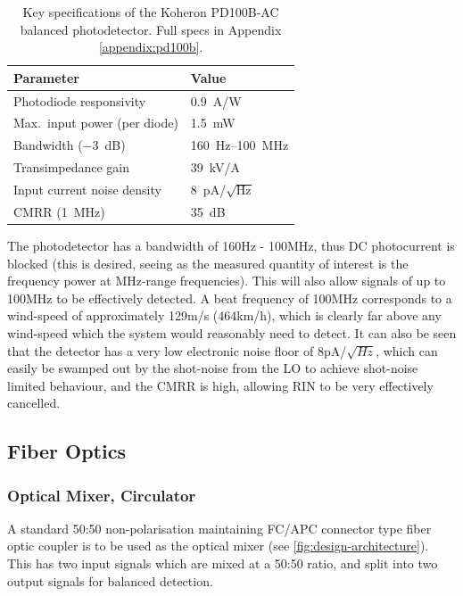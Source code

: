  \begin{table}[H]
 	\centering
 	
 	\begin{tabular}{@{}ll@{}}
 		\toprule
 		\textbf{Parameter} & \textbf{Value} \\
 		\midrule
 		Photodiode responsivity       & 0.9~A/W \\
 		Max.\ input power (per diode) & 1.5~mW \\
 		Bandwidth ($-3$~dB)           & 160~Hz--100~MHz \\
 		Transimpedance gain           & 39~kV/A \\
 		Input current noise density   & 8~pA/$\sqrt{\text{Hz}}$ \\
 		CMRR (1~MHz)                  & 35~dB \\
 		\bottomrule
 	\end{tabular}
 	
 	\caption{Key specifications of the Koheron PD100B-AC balanced photodetector. Full specs in Appendix \ref{appendix:pd100b}.}
 	\label{tab:pd100b}
 \end{table}
 
 The photodetector has a bandwidth of 160Hz - 100MHz, thus DC photocurrent is blocked (this is desired, seeing as the measured quantity of interest is the frequency power at MHz-range frequencies). This will also allow signals of up to 100MHz to be effectively detected. A beat frequency of 100MHz corresponds to a wind-speed of approximately 129m/s (464km/h), which is clearly far above any wind-speed which the system would reasonably need to detect. It can also be seen that the detector has a very low electronic noise floor of 8pA/$\sqrt{Hz}$, which can easily be swamped out by the shot-noise from the LO to achieve shot-noise limited behaviour, and the CMRR is high, allowing RIN to be very effectively cancelled. 
 
 \subsection{Fiber Optics}
 \subsubsection{Optical Mixer, Circulator}
A standard 50:50 non-polarisation maintaining FC/APC connector type fiber optic coupler is to be used as the optical mixer (see \autoref{fig:design-architecture}). This has two input signals which are mixed at a 50:50 ratio, and split into two output signals for balanced detection.

